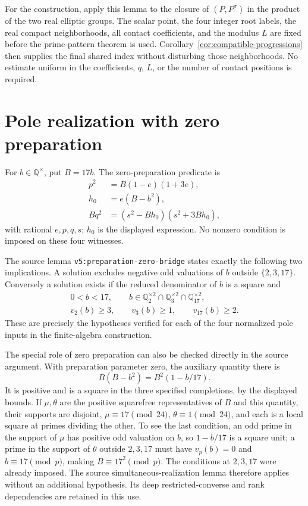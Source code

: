 \documentclass[11pt,a4paper]{article}
\theoremstyle{remark}\newtheorem{remark}[theorem]{Remark}
\newcommand{\Q}{\mathbb Q}\newcommand{\Z}{\mathbb Z}
\begin{document}
For the construction, apply this lemma to the closure of
$(P,P^\sigma)$ in the product of the two real elliptic groups.
The scalar point, the four integer root labels, the real compact
neighborhoods, all contact coefficients, and the modulus $L$ are fixed
before the prime-pattern theorem is used. Corollary~\ref{cor:compatible-progressions}
then supplies the final shared index without disturbing those
neighborhoods. No estimate uniform in the coefficients, $q$, $L$, or
the number of contact positions is required.

\section{Pole realization with zero preparation}
\label{sec:poles}

For $b\in\Q^\times$, put $B=17b$. The zero-preparation predicate is
\[
 \begin{aligned}
 p^2&=B(1-e)(1+3e),\\
 h_0&=e(B-b^2),\\
 Bq^2&=(s^2-Bh_0)(s^2+3Bh_0),
 \end{aligned}
\]
with rational $e,p,q,s$; $h_0$ is the displayed expression.
No nonzero condition is imposed on these four witnesses.

The source lemma \nolinkurl{v5:preparation-zero-bridge} states exactly
the following two implications. A solution excludes negative odd
valuations of $b$ outside $\{2,3,17\}$. Conversely a solution exists if
the reduced denominator of $b$ is a square and
\[
 \begin{gathered}
 0<b<17,\qquad b\in\Q_2^{\times2}\cap\Q_3^{\times2}
                              \cap\Q_{17}^{\times2},\\
 v_2(b)\ge3,\qquad v_3(b)\ge1,\qquad v_{17}(b)\ge2.
 \end{gathered}
\]
These are precisely the hypotheses verified for each of the four
normalized pole inputs in the finite-algebra construction.

The special role of zero preparation can also be checked directly in
the source argument. With preparation parameter zero, the auxiliary
quantity there is
\[
                    B(B-b^2)=B^2(1-b/17).
\]
It is positive and is a square in the three specified completions,
by the displayed bounds. If $\mu,\theta$ are the positive squarefree
representatives of $B$ and this quantity, their supports are disjoint,
$\mu\equiv17\pmod{24}$, $\theta\equiv1\pmod{24}$, and each is a
local square at primes dividing the other. To see the last condition,
an odd prime in the support of $\mu$ has positive odd valuation on $b$,
so $1-b/17$ is a square unit; a prime in the support of $\theta$ outside
$2,3,17$ must have $v_p(b)=0$ and $b\equiv17\pmod p$, making
$B\equiv17^2\pmod p$. The conditions at $2,3,17$ were already imposed.
The source simultaneous-realization lemma therefore applies without
an additional hypothesis. Its deep restricted-converse and rank
dependencies are retained in this use.
\end{document}
